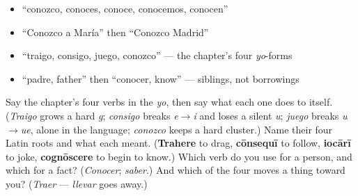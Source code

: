 \begin{itemize}
\raggedright
  \item \textquotedblleft{}conozco, conoces, conoce, conocemos, conocen\textquotedblright{}
  \item \textquotedblleft{}Conozco a María\textquotedblright{} then \textquotedblleft{}Conozco Madrid\textquotedblright{}
  \item \textquotedblleft{}traigo, consigo, juego, conozco\textquotedblright{} — the chapter's four \emph{yo}-forms
  \item \textquotedblleft{}padre, father\textquotedblright{} then \textquotedblleft{}conocer, know\textquotedblright{} — siblings, not borrowings
\end{itemize}

\begin{tcolorbox}[breakable,colback=teal!4,colframe=teal!35!black,title={Before you move on}]
Say the chapter's four verbs in the \emph{yo}, then say what each one does to itself. (\emph{Traigo} grows a hard \emph{g}; \emph{consigo} breaks \emph{e$\to$i} and loses a silent \emph{u}; \emph{juego} breaks \emph{u$\to$ue}, alone in the language; \emph{conozco} keeps a hard cluster.) Name their four Latin roots and what each meant. (\textbf{Trahere} to drag, \textbf{cōnsequī} to follow, \textbf{iocārī} to joke, \textbf{cognōscere} to begin to know.) Which verb do you use for a person, and which for a fact? (\emph{Conocer}; \emph{saber}.) And which of the four moves a thing toward you? (\emph{Traer} — \emph{llevar} goes away.)
\end{tcolorbox}

